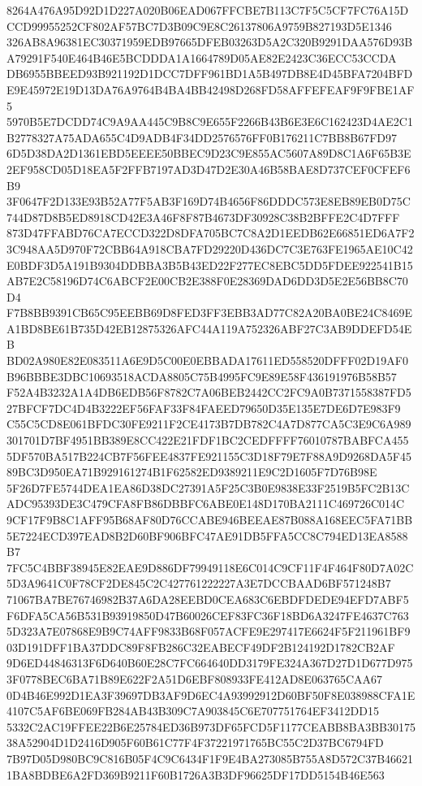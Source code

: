 \documentclass[UTF8,fontset=fandol,zihao=-4,a4paper]{ctexart}
\begin{document}
{{8264A476A95D92D1D227A020B06EAD067FFCBE7B113C7F5C5CF7FC76A15DCCD99955252CF802AF57BC7D3B09C9E8C26137806A9759B827193D5E1346
326AB8A96381EC30371959EDB97665DFEB03263D5A2C320B9291DAA576D93BA79291F540E464B46E5BCDDDA1A1664789D05AE82E2423C36ECC53CCDA
DB6955BBEED93B921192D1DCC7DFF961BD1A5B497DB8E4D45BFA7204BFDE9E45972E19D13DA76A9764B4BA4BB42498D268FD58AFFEFEAF9F9FBE1AF5
5970B5E7DCDD74C9A9AA445C9B8C9E655F2266B43B6E3E6C162423D4AE2C1B2778327A75ADA655C4D9ADB4F34DD2576576FF0B176211C7BB8B67FD97
6D5D38DA2D1361EBD5EEEE50BBEC9D23C9E855AC5607A89D8C1A6F65B3E2EF958CD05D18EA5F2FFB7197AD3D47D2E30A46B58BAE8D737CEF0CFEF6B9
3F0647F2D133E93B52A77F5AB3F169D74B4656F86DDDC573E8EB89EB0D75C744D87D8B5ED8918CD42E3A46F8F87B4673DF30928C38B2BFFE2C4D7FFF
873D47FFABD76CA7ECCD322D8DFA705BC7C8A2D1EEDB62E66851ED6A7F23C948AA5D970F72CBB64A918CBA7FD29220D436DC7C3E763FE1965AE10C42
E0BDF3D5A191B9304DDBBA3B5B43ED22F277EC8EBC5DD5FDEE922541B15AB7E2C58196D74C6ABCF2E00CB2E388F0E28369DAD6DD3D5E2E56BB8C70D4
F7B8BB9391CB65C95EEBB69D8FED3FF3EBB3AD77C82A20BA0BE24C8469EA1BD8BE61B735D42EB12875326AFC44A119A752326ABF27C3AB9DDEFD54EB
BD02A980E82E083511A6E9D5C00E0EBBADA17611ED558520DFFF02D19AF0B96BBBE3DBC10693518ACDA8805C75B4995FC9E89E58F436191976B58B57
F52A4B3232A1A4DB6EDB56F8782C7A06BEB2442CC2FC9A0B7371558387FD527BFCF7DC4D4B3222EF56FAF33F84FAEED79650D35E135E7DE6D7E983F9
C55C5CD8E061BFDC30FE9211F2CE4173B7DB782C4A7D877CA5C3E9C6A989301701D7BF4951BB389E8CC422E21FDF1BC2CEDFFFF76010787BABFCA455
5DF570BA517B224CB7F56FEE4837FE921155C3D18F79E7F88A9D9268DA5F4589BC3D950EA71B929161274B1F62582ED9389211E9C2D1605F7D76B98E
5F26D7FE5744DEA1EA86D38DC27391A5F25C3B0E9838E33F2519B5FC2B13CADC95393DE3C479CFA8FB86DBBFC6ABE0E148D170BA2111C469726C014C
9CF17F9B8C1AFF95B68AF80D76CCABE946BEEAE87B088A168EEC5FA71BB5E7224ECD397EAD8B2D60BF906BFC47AE91DB5FFA5CC8C794ED13EA8588B7
7FC5C4BBF38945E82EAE9D886DF79949118E6C014C9CF11F4F464F80D7A02C5D3A9641C0F78CF2DE845C2C427761222227A3E7DCCBAAD6BF571248B7
71067BA7BE76746982B37A6DA28EEBD0CEA683C6EBDFDEDE94EFD7ABF5F6DFA5CA56B531B93919850D47B60026CEF83FC36F18BD6A3247FE4637C763
5D323A7E07868E9B9C74AFF9833B68F057ACFE9E297417E6624F5F211961BF903D191DFF1BA37DDC89F8FB286C32EABECF49DF2B124192D1782CB2AF
9D6ED44846313F6D640B60E28C7FC664640DD3179FE324A367D27D1D677D9753F0778BEC6BA71B89E622F2A51D6EBF808933FE412AD8E063765CAA67
0D4B46E992D1EA3F39697DB3AF9D6EC4A93992912D60BF50F8E038988CFA1E4107C5AF6BE069FB284AB43B309C7A903845C6E707751764EF3412DD15
5332C2AC19FFEE22B6E25784ED36B973DF65FCD5F1177CEABB8BA3BB3017538A52904D1D2416D905F60B61C77F4F37221971765BC55C2D37BC6794FD
7B97D05D980BC9C816B05F4C9C6434F1F9E4BA273085B755A8D572C37B466211BA8BDBE6A2FD369B9211F60B1726A3B3DF96625DF17DD5154B46E563
}}
\end{document}

